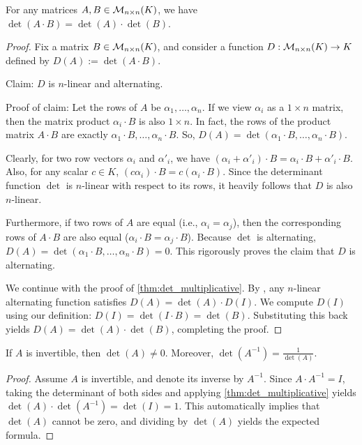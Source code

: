 \begin{theorem}
  \label{thm:det_multiplicative}
  For any matrices $A, B \in \mathcal{M}_{n \times n}(K)$, we have $\det(A \cdot B) = \det(A) \cdot \det(B)$.
\end{theorem}

\begin{proof}
  Fix a matrix $B \in \mathcal{M}_{n \times n}(K)$, and consider a function $D : \mathcal{M}_{n \times n}(K) \to K$ defined by $D(A) := \det(A \cdot B)$.

  Claim: $D$ is $n$-linear and alternating.

  Proof of claim: Let the rows of $A$ be $\alpha_1, \dots, \alpha_n$. If we view $\alpha_i$ as a $1 \times n$ matrix, then the matrix product $\alpha_i \cdot B$ is also $1 \times n$. In fact, the rows of the product matrix $A \cdot B$ are exactly $\alpha_1 \cdot B, \dots, \alpha_n \cdot B$. So, $D(A) = \det(\alpha_1 \cdot B, \dots, \alpha_n \cdot B)$.

  Clearly, for two row vectors $\alpha_i$ and $\alpha'_i$, we have $(\alpha_i + \alpha'_i) \cdot B = \alpha_i \cdot B + \alpha'_i \cdot B$. Also, for any scalar $c \in K$, $(c\alpha_i) \cdot B = c(\alpha_i \cdot B)$. Since the determinant function $\det$ is $n$-linear with respect to its rows, it heavily follows that $D$ is also $n$-linear.

  Furthermore, if two rows of $A$ are equal (i.e., $\alpha_i = \alpha_j$), then the corresponding rows of $A \cdot B$ are also equal ($\alpha_i \cdot B = \alpha_j \cdot B$). Because $\det$ is alternating, $D(A) = \det(\alpha_1 \cdot B, \dots, \alpha_n \cdot B) = 0$. This rigorously proves the claim that $D$ is alternating.

  We continue with the proof of \cref{thm:det_multiplicative}. By , any $n$-linear alternating function satisfies $D(A) = \det(A) \cdot D(I)$. We compute $D(I)$ using our definition: $D(I) = \det(I \cdot B) = \det(B)$. Substituting this back yields $D(A) = \det(A) \cdot \det(B)$, completing the proof.
\end{proof}

\begin{corollary}
  \label{cor:det_inverse}
  If $A$ is invertible, then $\det(A) \neq 0$. Moreover, $\det(A^{-1}) = \frac{1}{\det(A)}$.
\end{corollary}

\begin{proof}
  Assume $A$ is invertible, and denote its inverse by $A^{-1}$. Since $A \cdot A^{-1} = I$, taking the determinant of both sides and applying \cref{thm:det_multiplicative} yields $\det(A) \cdot \det(A^{-1}) = \det(I) = 1$. This automatically implies that $\det(A)$ cannot be zero, and dividing by $\det(A)$ yields the expected formula.
\end{proof}


